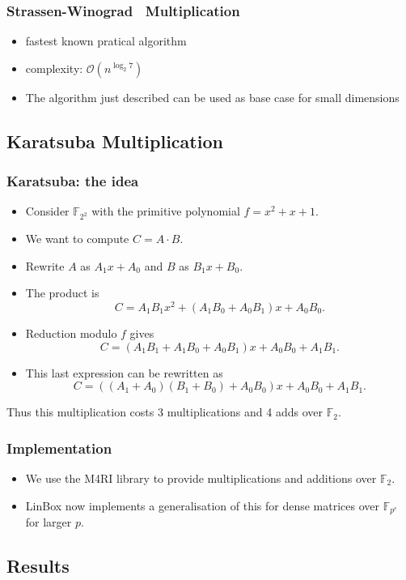 \documentclass[11pt]{beamer}
\newcommand{\field}[1]{\mathbb{#1}}
\newcommand{\F}{\ensuremath{\field{F}}\xspace}
\newcommand{\FZ}{\ensuremath{\field{F}_2}\xspace}
\newcommand{\ord}[1]{\ensuremath{\mathcal{O}\!\left(#1\right)}}
\begin{document}
\begin{frame}
\frametitle{Strassen-Winograd~\cite{Strassen} Multiplication}
\begin{itemize}
 \item fastest known pratical algorithm
 \item complexity: $\ord{n^{\log_2{7}}}$
 \item The algorithm just described can be used as base case for small dimensions
\end{itemize}
\end{frame}

\subsection{Karatsuba Multiplication}

\begin{frame}
\frametitle{Karatsuba: the idea}
\begin{itemize}
 \item Consider $\F_{2^2}$ with the primitive polynomial $f = x^2 + x + 1$.
 \item We want to compute $C = A \cdot B$. 
 \item Rewrite $A$ as $ A_1x + A_0$ and $B$ as $ B_1x + B_0$. 
 \item The product is $$C = A_1B_1x^2 + (A_1B_0 + A_0B_1)x + A_0B_0.$$
 \item Reduction modulo $f$ gives $$C = (A_1B_1 + A_1B_0 + A_0B_1)x + A_0B_0 + A_1B_1.$$
 \item  This last expression can be rewritten as $$C = ((A_1 + A_0)(B_1 + B_0) + A_0B_0)x + A_0B_0 + A_1B_1.$$
\end{itemize}
 
Thus this multiplication costs 3 multiplications and 4 adds over $\F_2$.
\end{frame}

\begin{frame}
\frametitle{Implementation}
\begin{itemize}
 \item We use the M4RI library to provide multiplications and additions over $\FZ$.
 \item LinBox now implements a generalisation of this for dense matrices over $\F_{p^e}$ for larger $p$.
\end{itemize}
 
\end{frame}


\subsection{Results}
\end{document}

